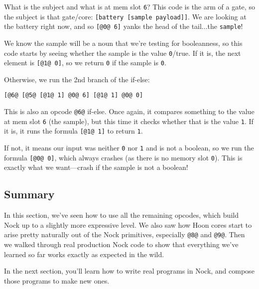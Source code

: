 \documentclass[twoside]{article}
\begin{document}
What is the subject and what is at mem slot \lstinline[style=inlinecode]{6}? This code is the arm of a gate, so the subject is that gate/core: \lstinline[style=inlinecode]{[battery [sample payload]]}. We are looking at the battery right now, and so \lstinline[style=inlinecode]{[@0@ 6]} yanks the head of the tail...the \lstinline[style=inlinecode]{sample}!

We know the sample will be a noun that we're testing for booleanness, so this code starts by seeing whether the sample is the value \lstinline[style=inlinecode]{0}/true. If it is, the next element is \lstinline[style=inlinecode]{[@1@ 0]}, so we return \lstinline[style=inlinecode]{0} if the sample is \lstinline[style=inlinecode]{0}.

Otherwise, we run the 2nd branch of the if-else:

\begin{lstlisting}[style=listingcode]
[@6@ [@5@ [@1@ 1] @0@ 6] [@1@ 1] @0@ 0]
\end{lstlisting}

This is also an opcode \lstinline[style=inlinecode]{@6@} if-else. Once again, it compares something to the value at mem slot \lstinline[style=inlinecode]{6} (the sample), but this time it checks whether that is the value \lstinline[style=inlinecode]{1}. If it is, it runs the formula \lstinline[style=inlinecode]{[@1@ 1]} to return \lstinline[style=inlinecode]{1}.

If not, it means our input was neither \lstinline[style=inlinecode]{0} nor \lstinline[style=inlinecode]{1} and is not a boolean, so we run the formula \lstinline[style=inlinecode]{[@0@ 0]}, which always crashes (as there is no memory slot \lstinline[style=inlinecode]{0}). This is exactly what we want—crash if the sample is not a boolean!

\subsection{Summary}

In this section, we've seen how to use all the remaining opcodes, which build Nock up to a slightly more expressive level. We also saw how Hoon cores start to arise pretty naturally out of the Nock primitives, especially \lstinline[style=inlinecode]{@8@} and \lstinline[style=inlinecode]{@9@}. Then we walked through real production Nock code to show that everything we've learned so far works exactly as expected in the wild.

In the next section, you'll learn how to write real programs in Nock, and compose those programs to make new ones.
\end{document}
